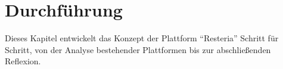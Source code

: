 \section{Durchführung}\label{sec:durchfuehrung}

Dieses Kapitel entwickelt das Konzept der Plattform \enquote{Resteria} Schritt für Schritt, von der Analyse bestehender Plattformen bis zur abschließenden Reflexion.








